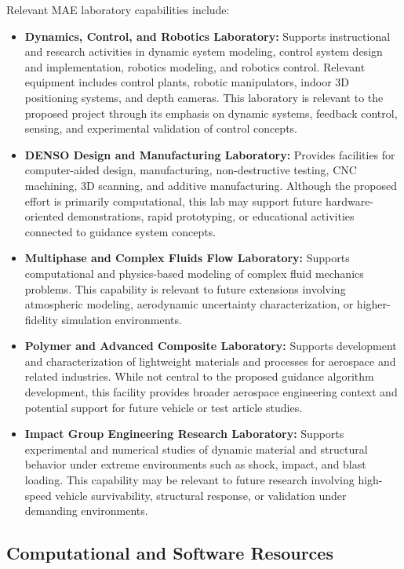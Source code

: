 Relevant MAE laboratory capabilities include:

\begin{itemize}
  \item \textbf{Dynamics, Control, and Robotics Laboratory:} Supports instructional and research activities in dynamic system modeling, control system design and implementation, robotics modeling, and robotics control. Relevant equipment includes control plants, robotic manipulators, indoor 3D positioning systems, and depth cameras. This laboratory is relevant to the proposed project through its emphasis on dynamic systems, feedback control, sensing, and experimental validation of control concepts.
  \item \textbf{DENSO Design and Manufacturing Laboratory:} Provides facilities for computer-aided design, manufacturing, non-destructive testing, CNC machining, 3D scanning, and additive manufacturing. Although the proposed effort is primarily computational, this lab may support future hardware-oriented demonstrations, rapid prototyping, or educational activities connected to guidance system concepts.
  \item \textbf{Multiphase and Complex Fluids Flow Laboratory:} Supports computational and physics-based modeling of complex fluid mechanics problems. This capability is relevant to future extensions involving atmospheric modeling, aerodynamic uncertainty characterization, or higher-fidelity simulation environments.
  \item \textbf{Polymer and Advanced Composite Laboratory:} Supports development and characterization of lightweight materials and processes for aerospace and related industries. While not central to the proposed guidance algorithm development, this facility provides broader aerospace engineering context and potential support for future vehicle or test article studies.
  \item \textbf{Impact Group Engineering Research Laboratory:} Supports experimental and numerical studies of dynamic material and structural behavior under extreme environments such as shock, impact, and blast loading. This capability may be relevant to future research involving high-speed vehicle survivability, structural response, or validation under demanding environments.
\end{itemize}

\subsection{Computational and Software Resources}


